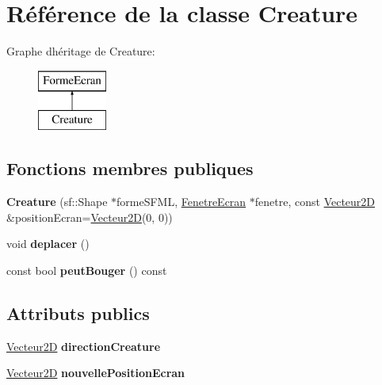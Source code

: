 \hypertarget{class_creature}{}\section{Référence de la classe Creature}
\label{class_creature}
Graphe d\textquotesingle{}héritage de Creature\+:\begin{figure}[H]
\begin{center}
\leavevmode
\includegraphics[height=2.000000cm]{class_creature}
\end{center}
\end{figure}
\subsection*{Fonctions membres publiques}
\begin{DoxyCompactItemize}
\item 
\mbox{\label{class_creature_ae6582091f049dd634af356bfa300c79c}} 
{\bfseries Creature} (sf\+::\+Shape $\ast$forme\+S\+F\+ML, \mbox{\hyperlink{class_fenetre_ecran}{Fenetre\+Ecran}} $\ast$fenetre, const \mbox{\hyperlink{class_vecteur2_d}{Vecteur2D}} \&position\+Ecran=\mbox{\hyperlink{class_vecteur2_d}{Vecteur2D}}(0, 0))
\item 
\mbox{\label{class_creature_a60858c265e1efbff31e18a1b9426d4a2}} 
void {\bfseries deplacer} ()
\item 
\mbox{\label{class_creature_a951edf54be6920be2b2a7010a307d5a7}} 
const bool {\bfseries peut\+Bouger} () const
\end{DoxyCompactItemize}
\subsection*{Attributs publics}
\begin{DoxyCompactItemize}
\item 
\mbox{\label{class_creature_a95ac7239d76b5a5b8eedf13243cb9ec8}} 
\mbox{\hyperlink{class_vecteur2_d}{Vecteur2D}} {\bfseries direction\+Creature}
\item 
\mbox{\label{class_creature_a5266d7ca7642264806e07ea4926442e7}} 
\mbox{\hyperlink{class_vecteur2_d}{Vecteur2D}} {\bfseries nouvelle\+Position\+Ecran}
\end{DoxyCompactItemize}
